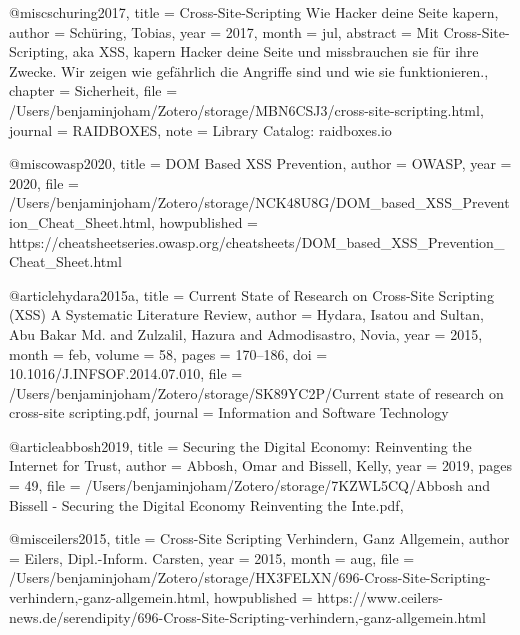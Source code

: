 @misc{schuring2017,
  title = {{Cross-Site-Scripting \textendash{} Wie Hacker deine Seite kapern}},
  author = {Sch{\"u}ring, Tobias},
  year = {2017},
  month = jul,
  abstract = {Mit Cross-Site-Scripting, aka XSS, kapern Hacker deine Seite und missbrauchen sie f{\"u}r ihre Zwecke. Wir zeigen wie gef{\"a}hrlich die Angriffe sind und wie sie funktionieren.},
  chapter = {Sicherheit},
  file = {/Users/benjaminjoham/Zotero/storage/MBN6CSJ3/cross-site-scripting.html},
  journal = {RAIDBOXES},
  note = {Library Catalog: raidboxes.io}
}

@misc{owasp2020,
  title = {{{DOM}} Based {{XSS Prevention}}},
  author = {{OWASP}},
  year = {2020},
  file = {/Users/benjaminjoham/Zotero/storage/NCK48U8G/DOM_based_XSS_Prevention_Cheat_Sheet.html},
  howpublished = {https://cheatsheetseries.owasp.org/cheatsheets/DOM\_based\_XSS\_Prevention\_Cheat\_Sheet.html}
}


@article{hydara2015a,
  title = {Current State of Research on Cross-Site Scripting ({{XSS}}) \textendash{} {{A}} Systematic Literature Review},
  author = {Hydara, Isatou and Sultan, Abu Bakar Md. and Zulzalil, Hazura and Admodisastro, Novia},
  year = {2015},
  month = feb,
  volume = {58},
  pages = {170--186},
  doi = {10.1016/J.INFSOF.2014.07.010},
  file = {/Users/benjaminjoham/Zotero/storage/SK89YC2P/Current state of research on cross-site scripting.pdf},
  journal = {Information and Software Technology}
}

@article{abbosh2019,
  title = {Securing the {{Digital Economy}}: {{Reinventing}} the {{Internet}} for {{Trust}}},
  author = {Abbosh, Omar and Bissell, Kelly},
  year = {2019},
  pages = {49},
  file = {/Users/benjaminjoham/Zotero/storage/7KZWL5CQ/Abbosh and Bissell - Securing the Digital Economy Reinventing the Inte.pdf},
}

@misc{eilers2015,
  title = {Cross-{{Site Scripting}} Verhindern, Ganz Allgemein},
  author = {Eilers, Dipl.-Inform. Carsten},
  year = {2015},
  month = aug,
  file = {/Users/benjaminjoham/Zotero/storage/HX3FELXN/696-Cross-Site-Scripting-verhindern,-ganz-allgemein.html},
  howpublished = {https://www.ceilers-news.de/serendipity/696-Cross-Site-Scripting-verhindern,-ganz-allgemein.html}
}



